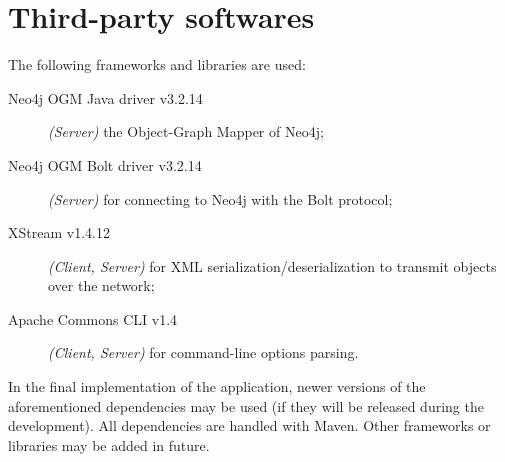\section{Third-party softwares}\label{sec:dependencies}

The following frameworks and libraries are used:

\begin{description}
	\item[Neo4j OGM Java driver v3.2.14] \textit{(Server)} the Object-Graph
		Mapper of Neo4j;
	\item[Neo4j OGM Bolt driver v3.2.14] \textit{(Server)} for connecting to
		Neo4j with the Bolt protocol;
	\item[XStream v1.4.12] \textit{(Client, Server)} for XML
		serialization/deserialization to transmit objects over the
		network;
	\item[Apache Commons CLI v1.4] \textit{(Client, Server)} for
		command-line options parsing.
\end{description}

In the final implementation of the application, newer versions of the
aforementioned dependencies may be used (if they will be released during the
development). All dependencies are handled with Maven. Other frameworks or
libraries may be added in future.
